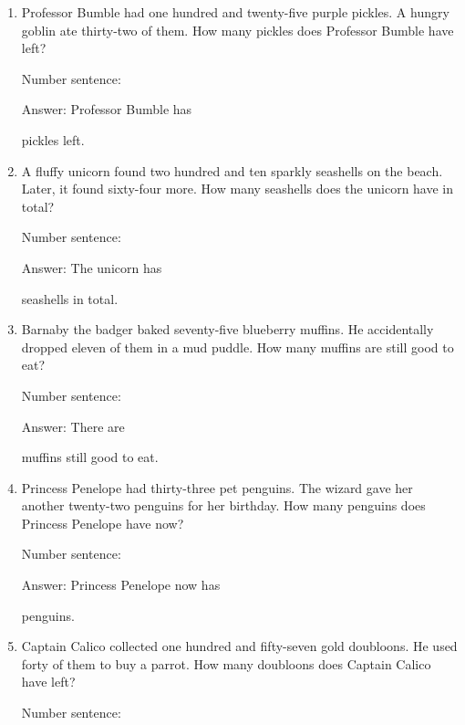 \documentclass{tufte-book}
\begin{document}
\begin{enumerate}

\item
  Professor Bumble had one hundred and twenty-five purple pickles. A
  hungry goblin ate thirty-two of them. How many pickles does Professor
  Bumble have left?\medskip\par
  Number sentence:
  \dotfill\medskip\par
  Answer: Professor Bumble has
  \dotfill\medskip\par\mbox{}\dotfill\medskip\par\mbox{}\dotfill\bigskip
  pickles left.
\item
  A fluffy unicorn found two hundred and ten sparkly seashells on the
  beach. Later, it found sixty-four more. How many seashells does the
  unicorn have in total?\medskip\par
  Number sentence:
  \dotfill\medskip\par
  Answer: The unicorn has
  \dotfill\medskip\par\mbox{}\dotfill\medskip\par\mbox{}\dotfill\bigskip
  seashells in total.
\item
  Barnaby the badger baked seventy-five blueberry muffins. He
  accidentally dropped eleven of them in a mud puddle. How many muffins
  are still good to eat?\medskip\par
  Number sentence:
  \dotfill\medskip\par
  Answer: There are
  \dotfill\medskip\par\mbox{}\dotfill\medskip\par\mbox{}\dotfill\bigskip
  muffins still good to eat.
\item
  Princess Penelope had thirty-three pet penguins. The wizard gave her
  another twenty-two penguins for her birthday. How many penguins does
  Princess Penelope have now?\medskip\par
  Number sentence:
  \dotfill\medskip\par
  Answer: Princess Penelope now has
  \dotfill\medskip\par\mbox{}\dotfill\medskip\par\mbox{}\dotfill\bigskip
  penguins.
\item
  Captain Calico collected one hundred and fifty-seven gold doubloons.
  He used forty of them to buy a parrot. How many doubloons does Captain
  Calico have left?\medskip\par
  Number sentence:
  \dotfill\medskip\par

\end{enumerate}
\end{document}
